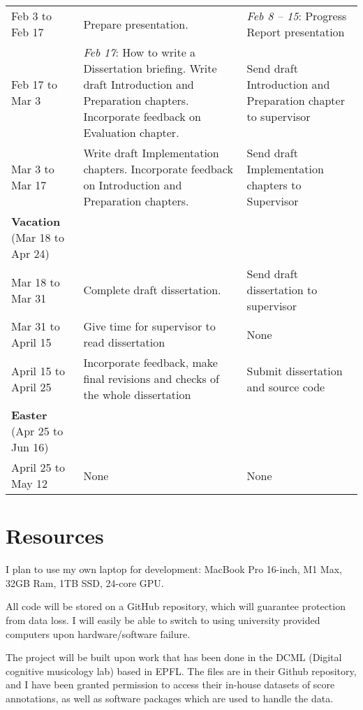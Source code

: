 \documentclass{article}
\begin{document}
\begin{tabularx}{\textwidth}{@{}l  p{180pt} p{110pt} @{}}
                  Feb 3 to Feb 17 & Prepare presentation. & \textit{Feb 8 -- 15}: Progress Report presentation       \\
  Feb 17 to Mar 3 & \textit{Feb 17}: How to write a Dissertation briefing. Write draft Introduction and Preparation chapters. Incorporate feedback on Evaluation chapter. &Send draft Introduction and Preparation chapter to supervisor       \\
  Mar 3 to Mar 17 & Write draft Implementation chapters. Incorporate feedback on Introduction and Preparation chapters.& Send draft Implementation chapters to Supervisor       \\
  \midrule
  \textbf{Vacation} (Mar 18 to Apr 24)  & &    \\ 
  Mar 18 to Mar 31 & Complete draft dissertation. & Send draft dissertation to supervisor       \\
  Mar 31 to April 15 & Give time for supervisor to read dissertation & None \\
  April 15 to April 25 & Incorporate feedback, make final revisions and checks of the whole dissertation & Submit dissertation and source code\\
  \midrule
  \textbf{Easter} (Apr 25 to Jun 16)  &  &    \\ 
   April 25 to May 12 & None      & None             \\ 
  \bottomrule
\end{tabularx}

\section{Resources}
I plan to use my own laptop for development: MacBook Pro 16-inch, M1 Max, 32GB Ram, 1TB SSD, 24-core GPU.

All code will be stored on a GitHub repository, which will guarantee protection from data loss. I will easily be able to switch to using university provided computers upon hardware/software failure.

The project will be built upon work that has been done in the DCML (Digital cognitive musicology lab) based in EPFL. The files are in their Github repository, and I have been granted permission to access their in-house datasets of score annotations, as well as software packages which are used to handle the data.
  
\end{document}
